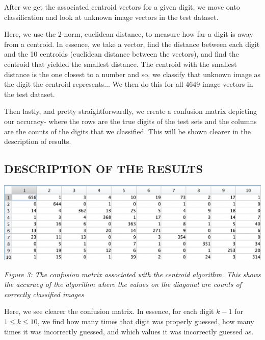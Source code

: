 \documentclass[dvipsnames,12pt]{article} %
\begin{document}
        \vskip 06pt

        \hskip 12pt After we get the associated centroid vectors for a given digit, we move onto classification and look at unknown image vectors in the test dataset.

        \vskip 06pt

        \hskip 12pt Here, we use the 2-norm, euclidean distance, to measure how far a digit is away from a centroid. In essence, we take a vector, find the distance between each digit and the 10 centroids (euclidean distance between the vectors), and find the centroid that yielded the smallest distance. The centroid with the smallest distance is the one closest to a number and so, we classify that unknown image as the digit the centroid represents... We then do this for all 4649 image vectors in the test dataset.

        \vskip 06pt

        \hskip 12pt Then lastly, and pretty straightforwardly, we create a confusion matrix depicting our accuracy- where the rows are the true digits of the test sets and the columns are the counts of the digits that we classified. This will be shown clearer in the description of results.

        

      \subsection{DESCRIPTION OF THE RESULTS}
       \label{SUBSECT 3.2:CENTROID RESULTS}

          \begin{center}
              \includegraphics[scale = 0.65]{Images/MAT 167 FPP Fig 3.png}

              \textit{Figure 3: The confusion matrix associated with the centroid algorithm. This shows the accuracy of the algorithm where the values on the diagonal are counts of correctly classified images}
          \end{center}

          \vskip 06pt

          \hskip 12pt Here, we see clearer the confusion matrix. In essence, for each digit $k-1$ for $1\leq k \leq 10$, we find how many times that digit was properly guessed, how many times it was incorrectly guessed, and which values it was incorrectly guessed as.
\end{document}
